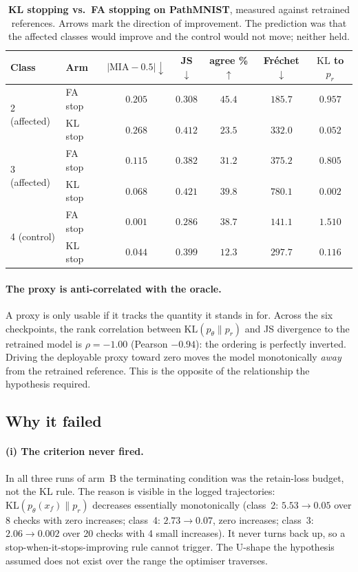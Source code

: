 \documentclass{article}
\newcommand{\KL}{\mathrm{KL}}
\theoremstyle{remark}
\theoremstyle{plain}
\begin{document}
\begin{table}[t]
\centering
\caption{\textbf{KL stopping vs.\ FA stopping on PathMNIST}, measured against
retrained references. Arrows mark the direction of improvement. The prediction
was that the affected classes would improve and the control would not move;
neither held.}
\label{tab:app_klstop}
\begin{tabular}{@{}llccccc@{}}
\toprule
Class & Arm & $|\mathrm{MIA}{-}0.5|\downarrow$ & JS$\downarrow$ &
agree \%$\uparrow$ & Fr\'echet$\downarrow$ & $\KL$ to $p_r$ \\
\midrule
\multirow{2}{*}{2 (affected)}
 & FA stop & $0.205$ & $0.308$ & $45.4$ & $185.7$ & $0.957$ \\
 & KL stop & $0.268$ & $0.412$ & $23.5$ & $332.0$ & $0.052$ \\
\midrule
\multirow{2}{*}{3 (affected)}
 & FA stop & $0.115$ & $0.382$ & $31.2$ & $375.2$ & $0.805$ \\
 & KL stop & $\mathbf{0.068}$ & $0.421$ & $\mathbf{39.8}$ & $780.1$ & $0.002$ \\
\midrule
\multirow{2}{*}{4 (control)}
 & FA stop & $0.001$ & $0.286$ & $38.7$ & $141.1$ & $1.510$ \\
 & KL stop & $0.044$ & $0.399$ & $12.3$ & $297.7$ & $0.116$ \\
\bottomrule
\end{tabular}
\end{table}

\paragraph{The proxy is anti-correlated with the oracle.}
A proxy is only usable if it tracks the quantity it stands in for. Across the
six checkpoints, the rank correlation between $\KL(p_\theta\|p_r)$ and JS
divergence to the retrained model is $\rho = -1.00$ (Pearson $-0.94$): the
ordering is perfectly inverted. Driving the deployable proxy toward zero moves
the model monotonically \emph{away} from the retrained reference. This is the
opposite of the relationship the hypothesis required.

\subsection{Why it failed}

\paragraph{(i) The criterion never fired.}
In all three runs of arm~B the terminating condition was the retain-loss budget,
not the KL rule. The reason is visible in the logged trajectories:
$\KL(p_\theta(x_f)\|p_r)$ decreases essentially monotonically (class~2:
$5.53 \to 0.05$ over 8 checks with zero increases; class~4: $2.73 \to 0.07$,
zero increases; class~3: $2.06 \to 0.002$ over 20 checks with 4 small
increases). It never turns back up, so a stop-when-it-stops-improving rule
cannot trigger. The U-shape the hypothesis assumed does not exist over the
range the optimiser traverses.
\end{document}
